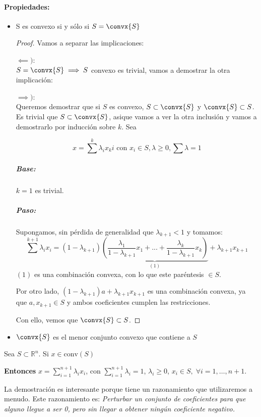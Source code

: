 \paragraph{Propiedades:}
\begin{itemize}
\item  S es convexo si y sólo si $S = \convx{S}$

\begin{proof} Vamos a separar las implicaciones:


$\impliedby)$:\\ $S = \convx{S} \implies S$ convexo es trivial, vamos a demostrar la otra implicación:

$\implies)$:\\ Queremos demostrar que si $S$ es convexo, $S\subset \convx{S}$ y $\convx{S}\subset S$. Es trivial que $S\subset\convx{S}$, asique vamos a ver la otra inclusión y vamos a demostrarlo por inducción sobre $k$. Sea

\[x = \sum^k λ_ix_ki \text{ con } x_i \in S,λ\geq 0, \sum λ = 1\]

\subparagraph{Base:} $k=1$ es trivial.

\subparagraph{Paso:} Supongamos, sin pérdida de generalidad que $λ_{k+1} < 1$ y tomamos:
\[\sum^{k+1} λ_ix_i = (1-λ_{k+1})\underbrace{\left(\frac{λ_1}{1-λ_{k+1}}x_1 + ... + \frac{λ_k}{1-λ_{k+1}}x_k \right)}_{(1)}+λ_{k+1}x_{k+1}\]
$(1)$ es una combinación convexa, con lo que este paréntesis $\in S$. 

Por otro lado, $(1-λ_{k+1})a + λ_{k+1}x_{k+1}$ es una combinación convexa, ya que $a,x_{k+1}\in S$ y ambos coeficientes cumplen las restricciones.

Con ello, vemos que $\convx{S}\subset S$.
\end{proof}


\item $\convx{S}$ es el menor conjunto convexo que contiene a $S$

\end{itemize}


\begin{theorem}
Sea $S\subset \mathbb{R}^n$. Si $x\in\mbox{conv}(S)$

\textbf{Entonces} $x=\sum_{i=1}^{n+1}\lambda_i x_i$, con $\sum_{i=1}^{n+1}\lambda_i=1$, $\lambda_i\geq 0$, $x_i\in S,\; \forall i=1,\ldots, n+1$.
\end{theorem}

La demostración es interesante porque tiene un razonamiento que utilizaremos a menudo. Este razonamiento es: \textit{Perturbar un conjunto de coeficientes para que alguno llegue a ser 0, pero sin llegar a obtener ningún coeficiente negativo.
}

